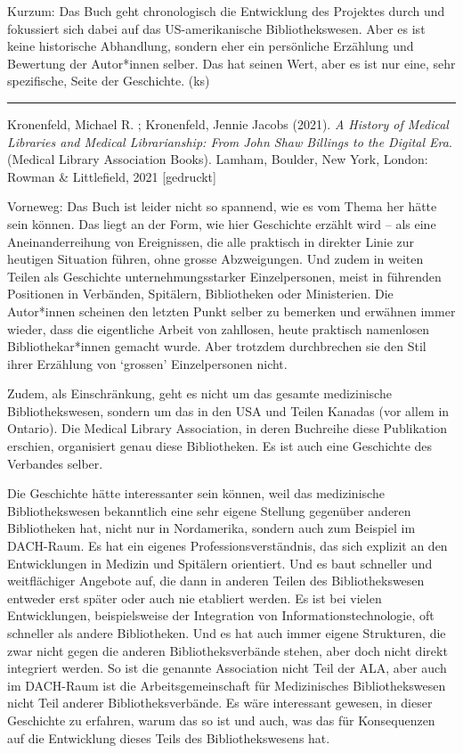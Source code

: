 \documentclass[a4paper,
fontsize=11pt,
oneside,
numbers=noperiodatend,
parskip=half-,
bibliography=totoc,
final
]{scrartcl}
\begin{document}
Kurzum: Das Buch geht chronologisch die Entwicklung des Projektes durch
und fokussiert sich dabei auf das US-amerikanische Bibliothekswesen.
Aber es ist keine historische Abhandlung, sondern eher ein persönliche
Erzählung und Bewertung der Autor*innen selber. Das hat seinen Wert,
aber es ist nur eine, sehr spezifische, Seite der Geschichte. (ks)

\begin{center}\rule{0.5\linewidth}{0.5pt}\end{center}

Kronenfeld, Michael R. ; Kronenfeld, Jennie Jacobs (2021). \emph{A
History of Medical Libraries and Medical Librarianship: From John Shaw
Billings to the Digital Era}. (Medical Library Association Books).
Lamham, Boulder, New York, London: Rowman \& Littlefield, 2021
{[}gedruckt{]}

Vorneweg: Das Buch ist leider nicht so spannend, wie es vom Thema her
hätte sein können. Das liegt an der Form, wie hier Geschichte erzählt
wird -- als eine Aneinanderreihung von Ereignissen, die alle praktisch
in direkter Linie zur heutigen Situation führen, ohne grosse
Abzweigungen. Und zudem in weiten Teilen als Geschichte
unternehmungsstarker Einzelpersonen, meist in führenden Positionen in
Verbänden, Spitälern, Bibliotheken oder Ministerien. Die Autor*innen
scheinen den letzten Punkt selber zu bemerken und erwähnen immer wieder,
dass die eigentliche Arbeit von zahllosen, heute praktisch namenlosen
Bibliothekar*innen gemacht wurde. Aber trotzdem durchbrechen sie den
Stil ihrer Erzählung von \enquote*{grossen} Einzelpersonen nicht.

Zudem, als Einschränkung, geht es nicht um das gesamte medizinische
Bibliothekswesen, sondern um das in den USA und Teilen Kanadas (vor
allem in Ontario). Die Medical Library Association, in deren Buchreihe
diese Publikation erschien, organisiert genau diese Bibliotheken. Es ist
auch eine Geschichte des Verbandes selber.

Die Geschichte hätte interessanter sein können, weil das medizinische
Bibliothekswesen bekanntlich eine sehr eigene Stellung gegenüber anderen
Bibliotheken hat, nicht nur in Nordamerika, sondern auch zum Beispiel im
DACH-Raum. Es hat ein eigenes Professionsverständnis, das sich explizit
an den Entwicklungen in Medizin und Spitälern orientiert. Und es baut
schneller und weitflächiger Angebote auf, die dann in anderen Teilen des
Bibliothekswesen entweder erst später oder auch nie etabliert werden. Es
ist bei vielen Entwicklungen, beispielsweise der Integration von
Informationstechnologie, oft schneller als andere Bibliotheken. Und es
hat auch immer eigene Strukturen, die zwar nicht gegen die anderen
Bibliotheksverbände stehen, aber doch nicht direkt integriert werden. So
ist die genannte Association nicht Teil der ALA, aber auch im DACH-Raum
ist die Arbeitsgemeinschaft für Medizinisches Bibliothekswesen nicht
Teil anderer Bibliotheksverbände. Es wäre interessant gewesen, in dieser
Geschichte zu erfahren, warum das so ist und auch, was das für
Konsequenzen auf die Entwicklung dieses Teils des Bibliothekswesens hat.
\end{document}
